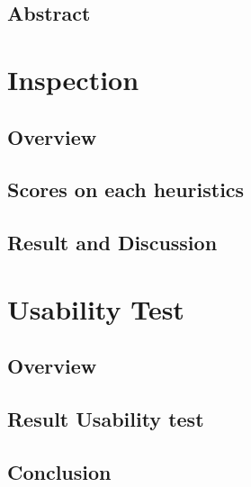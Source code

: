 \documentclass[fontsize=11pt,paper=a4,pagesize=auto]{report}
\begin{document}
\pagebreak
\tableofcontents
\chapter{Abstract}


\part{Inspection}

\chapter{Overview}
 

\chapter{Scores on each heuristics}



\chapter{Result and Discussion}



\part{Usability Test}

\chapter{Overview}


\chapter{Result Usability test}


\chapter{Conclusion}

\end{document}
